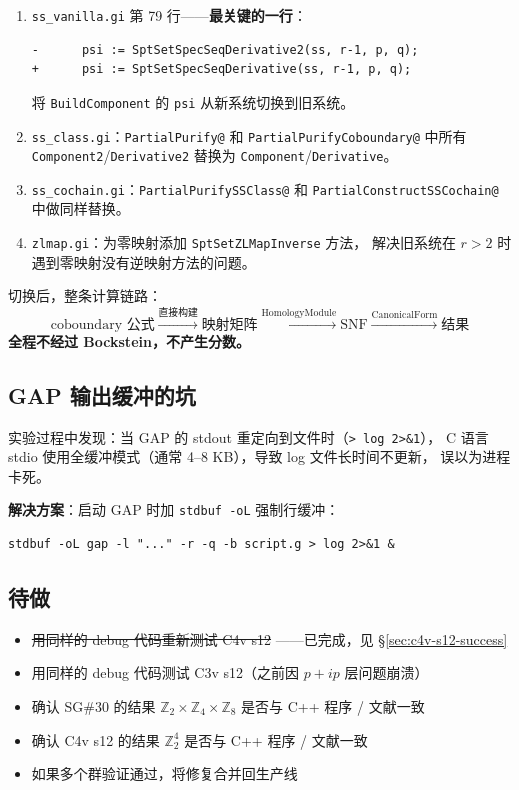 \documentclass[a4paper,fontset=ubuntu,12pt]{ctexart}
\begin{document}
\begin{enumerate}
\item \texttt{ss\_vanilla.gi} 第 79 行——\textbf{最关键的一行}：
\begin{verbatim}
-      psi := SptSetSpecSeqDerivative2(ss, r-1, p, q);
+      psi := SptSetSpecSeqDerivative(ss, r-1, p, q);
\end{verbatim}
      将 \texttt{BuildComponent} 的 \texttt{psi} 从新系统切换到旧系统。

\item \texttt{ss\_class.gi}：\texttt{PartialPurify@} 和 \texttt{PartialPurifyCoboundary@}
      中所有 \texttt{Component2}/\texttt{Derivative2} 替换为
      \texttt{Component}/\texttt{Derivative}。

\item \texttt{ss\_cochain.gi}：\texttt{PartialPurifySSClass@} 和
      \texttt{PartialConstructSSCochain@} 中做同样替换。

\item \texttt{zlmap.gi}：为零映射添加 \texttt{SptSetZLMapInverse} 方法，
      解决旧系统在 $r > 2$ 时遇到零映射没有逆映射方法的问题。
\end{enumerate}

切换后，整条计算链路：
\[
\text{coboundary 公式} \xrightarrow{\text{直接构建}} \text{映射矩阵}
\xrightarrow{\text{HomologyModule}} \text{SNF} \xrightarrow{\text{CanonicalForm}} \text{结果}
\]
\textbf{全程不经过 Bockstein，不产生分数。}

\subsection{GAP 输出缓冲的坑}

实验过程中发现：当 GAP 的 stdout 重定向到文件时（\texttt{> log 2>\&1}），
C 语言 stdio 使用全缓冲模式（通常 4--8 KB），导致 log 文件长时间不更新，
误以为进程卡死。

\textbf{解决方案}：启动 GAP 时加 \texttt{stdbuf -oL} 强制行缓冲：
\begin{verbatim}
stdbuf -oL gap -l "..." -r -q -b script.g > log 2>&1 &
\end{verbatim}

\subsection{待做}

\begin{itemize}
\item \sout{用同样的 debug 代码重新测试 C4v s12} ——已完成，见 \S\ref{sec:c4v-s12-success}
\item 用同样的 debug 代码测试 C3v s12（之前因 $p{+}ip$ 层问题崩溃）
\item 确认 SG\#30 的结果 $\mathbb{Z}_2 \times \mathbb{Z}_4 \times \mathbb{Z}_8$
      是否与 C++ 程序 / 文献一致
\item 确认 C4v s12 的结果 $\mathbb{Z}_2^4$ 是否与 C++ 程序 / 文献一致
\item 如果多个群验证通过，将修复合并回生产线
\end{itemize}
\end{document}
